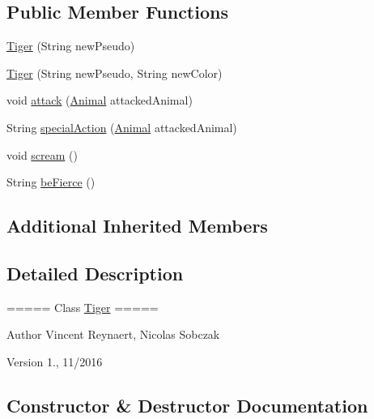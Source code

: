 \subsection*{Public Member Functions}
\begin{DoxyCompactItemize}
\item 
\hyperlink{classanimal_package_1_1_tiger_abe8e89cf608f68913595987734122e10}{Tiger} (String new\+Pseudo)
\item 
\hyperlink{classanimal_package_1_1_tiger_afa1cdc462c70c51b4cb98f5b3e917cb2}{Tiger} (String new\+Pseudo, String new\+Color)
\item 
void \hyperlink{classanimal_package_1_1_tiger_a977dc38b64fd5cfcd4e2ae3de1961b9e}{attack} (\hyperlink{classanimal_package_1_1_animal}{Animal} attacked\+Animal)
\item 
String \hyperlink{classanimal_package_1_1_tiger_aad61b38dbdbd08c6901eeff28e0c4d34}{special\+Action} (\hyperlink{classanimal_package_1_1_animal}{Animal} attacked\+Animal)
\item 
void \hyperlink{classanimal_package_1_1_tiger_a761264a91fd1bbe3684e70dbb4907fbd}{scream} ()
\item 
String \hyperlink{classanimal_package_1_1_tiger_a9c941af145fed9f1d71176ff6a752e16}{be\+Fierce} ()
\end{DoxyCompactItemize}
\subsection*{Additional Inherited Members}


\subsection{Detailed Description}
===== Class \hyperlink{classanimal_package_1_1_tiger}{Tiger} =====

\begin{DoxyAuthor}{Author}
Vincent Reynaert, Nicolas Sobczak 
\end{DoxyAuthor}
\begin{DoxyVersion}{Version}
1., 11/2016 
\end{DoxyVersion}


\subsection{Constructor \& Destructor Documentation}
